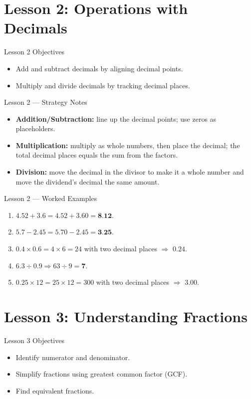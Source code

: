 \documentclass[aspectratio=169]{beamer}
\begin{document}
\section{Lesson 2: Operations with Decimals}
\begin{frame}{Lesson 2 Objectives}
\begin{itemize}
  \item Add and subtract decimals by aligning decimal points.
  \item Multiply and divide decimals by tracking decimal places.
\end{itemize}
\end{frame}

\begin{frame}{Lesson 2 --- Strategy Notes}
\begin{itemize}
  \item \textbf{Addition/Subtraction:} line up the decimal points; use zeros as placeholders.
  \item \textbf{Multiplication:} multiply as whole numbers, then place the decimal; the total decimal places equals the sum from the factors.
  \item \textbf{Division:} move the decimal in the divisor to make it a whole number and move the dividend's decimal the same amount.
\end{itemize}
\end{frame}

\begin{frame}{Lesson 2 --- Worked Examples}
\begin{enumerate}
  \item $4.52+3.6=4.52+3.60=\textbf{8.12}$.
  \item $5.7-2.45=5.70-2.45=\textbf{3.25}$.
  \item $0.4\times0.6=4\times6=24$ with two decimal places $\Rightarrow$ \textbf{$0.24$}.
  \item $6.3\div0.9 \Rightarrow 63\div9=\textbf{7}$.
  \item $0.25\times12=25\times12=300$ with two decimal places $\Rightarrow$ \textbf{$3.00$}.
\end{enumerate}
\end{frame}

\section{Lesson 3: Understanding Fractions}
\begin{frame}{Lesson 3 Objectives}
\begin{itemize}
  \item Identify numerator and denominator.
  \item Simplify fractions using greatest common factor (GCF).
  \item Find equivalent fractions.
\end{itemize}
\end{frame}
\end{document}
